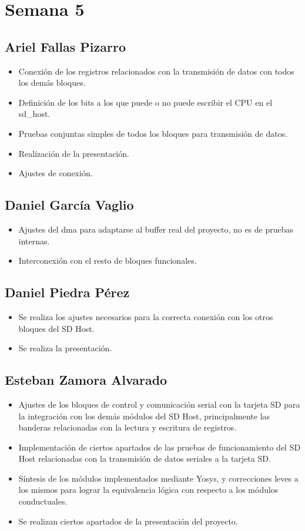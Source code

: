 \section{Semana 5}
\subsection{Ariel Fallas Pizarro}
\begin{itemize}
\item Conexión de los registros relacionados con la transmisión de datos con todos los demás bloques. 
\item Definición de los bits a los que puede o no puede escribir el CPU en el sd\_host.
\item Pruebas conjuntas simples de todos los bloques para transmisión de datos.
\item Realización de la presentación.
\item Ajustes de conexión.
\end{itemize}

\subsection{Daniel García Vaglio}
\begin{itemize}
\item Ajustes del dma para adaptarse al buffer real del proyecto, no es de pruebas internas.
\item Interconexión con el resto de bloques funcionales. 
\end{itemize}
\subsection{Daniel Piedra Pérez}
\begin{itemize}
\item Se realiza los ajustes necesarios para la correcta conexión con los otros bloques del SD Host.
\item Se realiza la presentación.

\end{itemize}

\subsection{Esteban Zamora Alvarado}
\begin{itemize}
\item Ajustes de los bloques de control y comunicación serial con la tarjeta SD para la integración
  con los demás módulos del SD Host, principalmente las banderas relacionadas con la lectura y
  escritura de registros.
\item Implementación de ciertos apartados de las pruebas de funcionamiento del SD Host relacionadas
  con la transmisión de datos seriales a la tarjeta SD.
\item Síntesis de los módulos implementados mediante Yosys, y correcciones leves a los mismos para
  lograr la equivalencia lógica con respecto a los módulos conductuales.
\item Se realizan ciertos apartados de la presentación del proyecto.
\end{itemize}
\newpage


